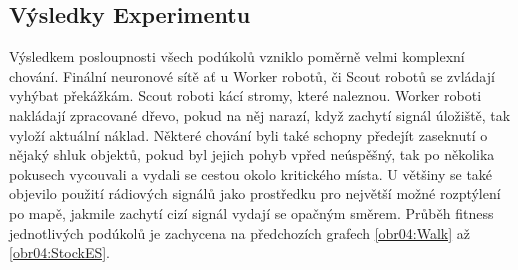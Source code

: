 	\subsection{Výsledky Experimentu}
	Výsledkem posloupnosti všech podúkolů vzniklo poměrně velmi komplexní chování. Finální neuronové sítě ať u Worker robotů, či Scout robotů se zvládají vyhýbat překážkám. Scout roboti kácí stromy, které naleznou. Worker roboti nakládají zpracované dřevo, pokud na něj narazí, když zachytí signál úložiště, tak vyloží aktuální náklad. Některé chování byli také schopny předejít zaseknutí o nějaký shluk objektů, pokud byl  jejich pohyb vpřed neúspěšný, tak po několika pokusech vycouvali a vydali se cestou okolo kritického místa. U většiny se také objevilo použití rádiových signálů jako prostředku pro největší možné rozptýlení po mapě, jakmile zachytí cizí signál vydají se opačným směrem. Průběh fitness jednotlivých podúkolů je zachycena na předchozích grafech \ref{obr04:Walk} až \ref{obr04:StockES}. 
	
